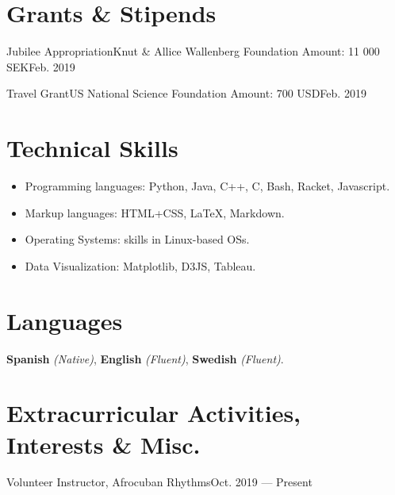 \documentclass[letterpaper,11pt]{article}
\begin{document}
\section{Grants \& Stipends}
\resumeSubHeadingListStart
\resumeSubheading
{Jubilee Appropriation}{Knut \& Allice Wallenberg Foundation}
{Amount: 11 000 SEK}{Feb. 2019}
\resumeItemListStart
{}
\resumeItemListEnd

\resumeSubheading
{Travel Grant}{US National Science Foundation} %
{Amount: 700 USD}{Feb. 2019}
\resumeItemListStart
{}
\resumeItemListEnd

\resumeSubHeadingListEnd

\nocite{*}
\printbibliography[title={Publications}]%

\section{Technical Skills}
\begin{itemize}[leftmargin=*]
  \item Programming languages: Python, Java, C++, C, Bash, Racket, Javascript.
  \vspace{-5pt}\item Markup languages: HTML+CSS, \LaTeX, Markdown.
  \vspace{-5pt}\item Operating Systems: skills in Linux-based OSs.
  \vspace{-5pt}\item Data Visualization: Matplotlib, D3JS, Tableau.
\end{itemize}

\section{Languages}
\textbf{Spanish} \emph{(Native)}, \textbf{English} \emph{(Fluent)}, \textbf{Swedish} \emph{(Fluent)}.

\section{Extracurricular Activities, Interests \& Misc.}
\resumeSubHeadingListStart
{}
{Volunteer Instructor, Afrocuban Rhythms}{Oct. 2019 --- Present}
\end{document}
